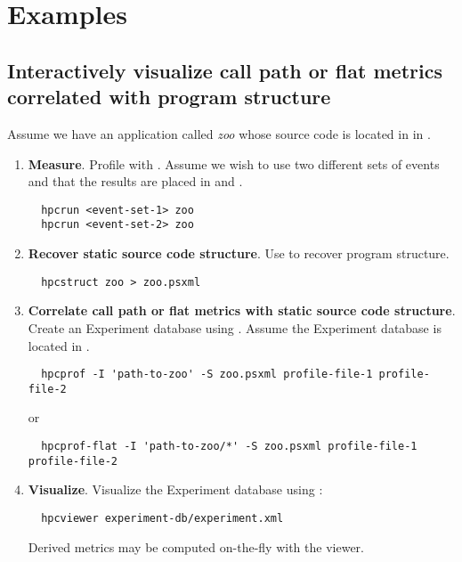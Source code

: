 \documentclass[english]{article}
\begin{document}
\section{Examples}

\subsection{Interactively visualize call path or flat metrics correlated with program structure}

Assume we have an application called \emph{zoo} whose source code is located in in .

\begin{enumerate}
\item \textbf{Measure}.  Profile with .  Assume we wish to use two different sets of events and that the results are placed in  and .
\begin{verbatim}
  hpcrun <event-set-1> zoo
  hpcrun <event-set-2> zoo
\end{verbatim}

\item \textbf{Recover static source code structure}. Use  to recover program structure.
\begin{verbatim}
  hpcstruct zoo > zoo.psxml
\end{verbatim}

\item \textbf{Correlate call path or flat metrics with static source code structure}.
Create an Experiment database using .  Assume the Experiment database is located in .
\begin{verbatim}
  hpcprof -I 'path-to-zoo' -S zoo.psxml profile-file-1 profile-file-2
\end{verbatim}
or
\begin{verbatim}
  hpcprof-flat -I 'path-to-zoo/*' -S zoo.psxml profile-file-1 profile-file-2
\end{verbatim}

\item \textbf{Visualize}.
Visualize the Experiment database using :
\begin{verbatim}
  hpcviewer experiment-db/experiment.xml
\end{verbatim}
Derived metrics may be computed on-the-fly with the viewer.

\end{enumerate}
\end{document}
